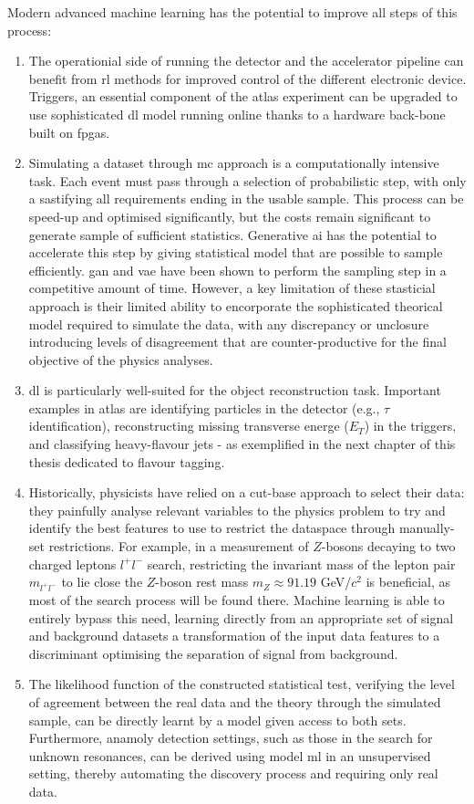 Modern advanced machine learning has the potential to improve all steps of this process:
\begin{enumerate}
    \item The operationial side of running the detector and the accelerator pipeline can benefit from \gls{rl} methods for improved control of the different electronic device. Triggers, an essential component of the \gls{atlas} experiment can be upgraded to use sophisticated \gls{dl} model running online thanks to a hardware back-bone built on \gls{fpga}s.
    \item Simulating a dataset through \gls{mc} approach is a computationally intensive task. Each event must pass through a selection of probabilistic step, with only a sastifying all requirements ending in the usable sample. This process can be speed-up and optimised significantly, but the costs remain significant to generate sample of sufficient statistics. Generative \gls{ai} has the potential to accelerate this step by giving statistical model that are possible to sample efficiently. \gls{gan} and \gls{vae} have been shown to perform the sampling step in a competitive amount of time. However, a key limitation of these stasticial approach is their limited ability to encorporate the sophisticated theorical model required to simulate the data, with any discrepancy or unclosure introducing levels of disagreement that are counter-productive for the final objective of the physics analyses.
    \item \gls{dl} is particularly well-suited for the object reconstruction task. Important examples in \gls{atlas} are identifying particles in the detector (e.g., $\tau$ identification), reconstructing missing transverse energe ($E_T$) in the triggers, and classifying heavy-flavour jets - as exemplified in the next chapter of this thesis dedicated to flavour tagging. 
    \item Historically, physicists have relied on a cut-base approach to select their data: they painfully analyse relevant variables to the physics problem to try and identify the best features to use to restrict the dataspace through manually-set restrictions. For example, in a measurement of $Z$-bosons decaying to two charged leptons $l^+l^-$ search, restricting the invariant mass of the lepton pair $m_{l^+l^-}$ to lie close the $Z$-boson rest mass $m_Z \approx 91.19$ GeV/$c^2$ is beneficial, as most of the search process will be found there. Machine learning is able to entirely bypass this need, learning directly from an appropriate set of signal and background datasets a transformation of the input data features to a discriminant optimising the separation of signal from background. 
    \item The likelihood function of the constructed statistical test, verifying the level of agreement between the real data and the theory through the simulated sample, can be directly learnt by a model given access to both sets. Furthermore, anamoly detection settings, such as those in the search for unknown resonances, can be derived using model \gls{ml} in an unsupervised setting, thereby automating the discovery process and requiring only real data. 
\end{enumerate}

